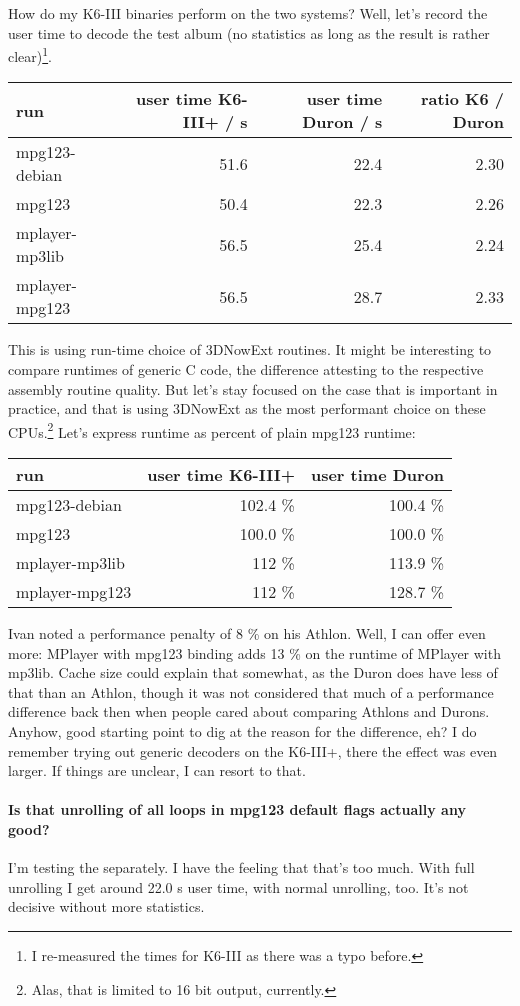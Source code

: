 \documentclass[a4paper,12pt]{scrartcl}
\begin{document}
How do my K6-III binaries perform on the two systems? Well, let's record the user time to decode the test album (no statistics as long as the result is rather clear)\footnote{I re-measured the times for K6-III as there was a typo before.}.
\begin{center}
\begin{tabular}{lrrr}
run & user time K6-III+ / s & user time Duron / s & ratio K6 / Duron \\
\hline
mpg123-debian & 51.6 & 22.4 & 2.30 \\
mpg123 & 50.4 & 22.3 & 2.26 \\
mplayer-mp3lib & 56.5 & 25.4 & 2.24 \\
mplayer-mpg123 & 56.5 & 28.7 & 2.33
\end{tabular}
\end{center}

This is using run-time choice of 3DNowExt routines. It might be interesting to compare runtimes of generic C code, the difference attesting to the respective assembly routine quality.
But let's stay focused on the case that is important in practice, and that is using 3DNowExt as the most performant choice on these CPUs.\footnote{Alas, that is limited to 16 bit output, currently.}
Let's express runtime as percent of plain mpg123 runtime:
\begin{center}
\begin{tabular}{lrr}
run & user time K6-III+ & user time Duron \\
\hline
mpg123-debian & 102.4 \% & 100.4 \% \\
mpg123 & 100.0 \% & 100.0 \% \\
mplayer-mp3lib & 112 \% & 113.9 \% \\
mplayer-mpg123 & 112 \% & 128.7 \%
\end{tabular}
\end{center}

Ivan noted a performance penalty of 8 \% on his Athlon. Well, I can offer even more: MPlayer with mpg123 binding adds 13 \% on the runtime of MPlayer with mp3lib. Cache size could explain that somewhat, as the Duron does have less of that than an Athlon, though it was not considered that much of a performance difference back then when people cared about comparing Athlons and Durons.
Anyhow, good starting point to dig at the reason for the difference, eh? I do remember trying out generic decoders on the K6-III+, there the effect was even larger. If things are unclear, I can resort to that.


\paragraph{Is that unrolling of all loops in mpg123 default flags actually any good?}
I'm testing the separately. I have the feeling that that's too much. With full unrolling I get around 22.0 s user time, with normal unrolling, too. It's not decisive without more statistics.
\end{document}
